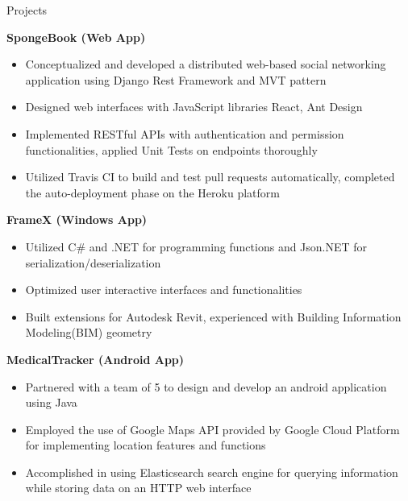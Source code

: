 \documentclass{resume} %
\begin{document}
\begin{rSection}{Projects}

{\bf SpongeBook (Web App)}
\begin{itemize}
\item Conceptualized and developed a distributed web-based social networking application using Django Rest Framework and MVT pattern
\item Designed web interfaces with JavaScript libraries React, Ant Design
\item Implemented RESTful APIs with authentication and permission functionalities, applied Unit Tests on endpoints thoroughly
\item Utilized Travis CI to build and test pull requests automatically, completed the auto-deployment phase on the Heroku platform
\end{itemize}

{\bf FrameX  (Windows App)}
\begin{itemize}
\item Utilized C\# and .NET for programming functions and Json.NET for serialization/deserialization
\item Optimized user interactive interfaces and functionalities
\item Built extensions for Autodesk Revit, experienced with Building Information Modeling(BIM) geometry
\end{itemize}

{\bf MedicalTracker (Android  App)}
\begin{itemize}
\item Partnered with a team of 5 to design and develop an android application using Java
\item Employed the use of Google Maps API provided by Google Cloud Platform for implementing location features and functions
\item Accomplished in using Elasticsearch search engine for querying information while storing data on an HTTP web interface
\end{itemize}
\end{rSection}
\end{document}
